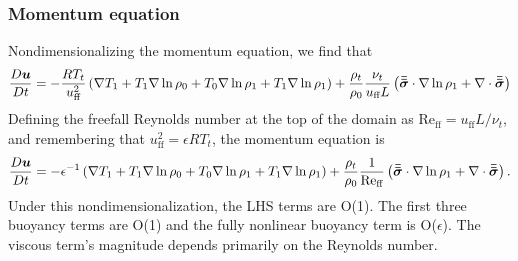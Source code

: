 \subsubsection{Momentum equation}
Nondimensionalizing the momentum equation, we find that
\begin{equation}
\frac{D \bm{u}}{D t} = -\frac{ R T_t }{u_{\text{ff}}^2}\left(\nabla T_1 + T_1\nabla\ln\rho_0 + T_0 \nabla\ln\rho_1 + T_1\nabla\ln\rho_1\right)
+ \frac{\rho_t}{\rho_0}\frac{\nu_t}{u_{\text{ff}} L} \left(\bm{\bar{\bar{\sigma}}}\cdot\nabla\ln\rho_1 + \nabla\cdot\bm{\bar{\bar{\sigma}}}\right)
\end{equation}
Defining the freefall Reynolds number at the top of the domain as $\text{Re}_{\text{ff}} = u_{\text{ff}} L / \nu_t$, and remembering that $u_{\text{ff}}^2 = \epsilon R T_t$, the momentum equation is
\begin{equation}
\frac{D \bm{u}}{D t} = -\epsilon^{-1}\left(\nabla T_1 + T_1\nabla\ln\rho_0 + T_0 \nabla\ln\rho_1 + T_1\nabla\ln\rho_1\right)
+ \frac{\rho_t}{\rho_0}\frac{1}{\text{Re}_{\text{ff}}} \left(\bm{\bar{\bar{\sigma}}}\cdot\nabla\ln\rho_1 + \nabla\cdot\bm{\bar{\bar{\sigma}}}\right).
\end{equation}
Under this nondimensionalization, the LHS terms are O(1).
The first three buoyancy terms are O(1) and the fully nonlinear buoyancy term is O($\epsilon$).
The viscous term's magnitude depends primarily on the Reynolds number.

